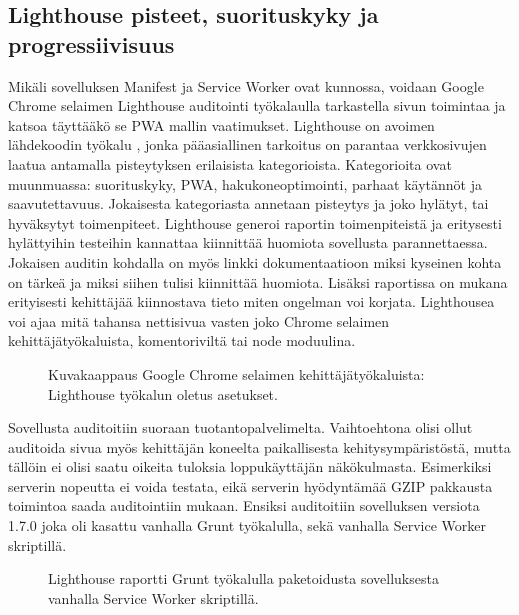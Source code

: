 \documentclass{tktltiki}
\begin{document}
\subsection{Lighthouse pisteet, suorituskyky ja progressiivisuus}

Mikäli sovelluksen Manifest ja Service Worker ovat kunnossa, voidaan Google Chrome selaimen Lighthouse auditointi työkalaulla tarkastella sivun toimintaa ja katsoa täyttääkö se PWA mallin vaatimukset. Lighthouse on avoimen lähdekoodin työkalu \cite{Google2}, jonka pääasiallinen tarkoitus on parantaa verkkosivujen laatua antamalla pisteytyksen erilaisista kategorioista. Kategorioita ovat muunmuassa: suorituskyky, PWA, hakukoneoptimointi, parhaat käytännöt ja saavutettavuus. Jokaisesta kategoriasta annetaan pisteytys ja joko hylätyt, tai hyväksytyt toimenpiteet. Lighthouse generoi raportin toimenpiteistä ja eritysesti hylättyihin testeihin kannattaa kiinnittää huomiota sovellusta parannettaessa. Jokaisen auditin kohdalla on myös linkki dokumentaatioon miksi kyseinen kohta on tärkeä ja miksi siihen tulisi kiinnittää huomiota. Lisäksi raportissa on mukana erityisesti kehittäjää kiinnostava tieto miten ongelman voi korjata. Lighthousea voi ajaa mitä tahansa nettisivua vasten joko Chrome selaimen kehittäjätyökaluista, komentoriviltä tai node moduulina.

\begin{figure}[h]
\begin{center}
\caption{Kuvakaappaus Google Chrome selaimen kehittäjätyökaluista: Lighthouse työkalun oletus asetukset.}
\label{Lighthouse}
\end{center}
\end{figure}

\clearpage

Sovellusta auditoitiin suoraan tuotantopalvelimelta. Vaihtoehtona olisi ollut auditoida sivua myös kehittäjän koneelta paikallisesta kehitysympäristöstä, mutta tällöin ei olisi saatu oikeita tuloksia loppukäyttäjän näkökulmasta. Esimerkiksi serverin nopeutta ei voida testata, eikä serverin hyödyntämää GZIP pakkausta toimintoa saada auditointiin mukaan. Ensiksi auditoitiin sovelluksen versiota 1.7.0 joka oli kasattu vanhalla Grunt työkalulla, sekä vanhalla Service Worker skriptillä. 

\begin{figure}[h]
\begin{center}
\caption{Lighthouse raportti Grunt työkalulla paketoidusta sovelluksesta vanhalla Service Worker skriptillä.}
\label{Lighthouse raportti 1}
\end{center}
\end{figure}
\end{document}
